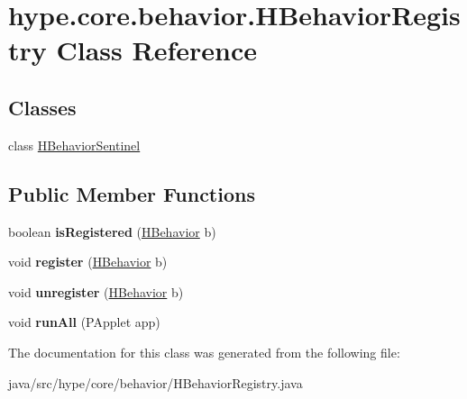 \hypertarget{classhype_1_1core_1_1behavior_1_1_h_behavior_registry}{\section{hype.\-core.\-behavior.\-H\-Behavior\-Registry Class Reference}
\label{classhype_1_1core_1_1behavior_1_1_h_behavior_registry}
}
\subsection*{Classes}
\begin{DoxyCompactItemize}
\item 
class \hyperlink{classhype_1_1core_1_1behavior_1_1_h_behavior_registry_1_1_h_behavior_sentinel}{H\-Behavior\-Sentinel}
\end{DoxyCompactItemize}
\subsection*{Public Member Functions}
\begin{DoxyCompactItemize}
\item 
\hypertarget{classhype_1_1core_1_1behavior_1_1_h_behavior_registry_a0cc3b424160638e969abbcdd5b82584a}{boolean {\bfseries is\-Registered} (\hyperlink{classhype_1_1core_1_1behavior_1_1_h_behavior}{H\-Behavior} b)}\label{classhype_1_1core_1_1behavior_1_1_h_behavior_registry_a0cc3b424160638e969abbcdd5b82584a}

\item 
\hypertarget{classhype_1_1core_1_1behavior_1_1_h_behavior_registry_a2701612175cd8b3a462901daa47fc447}{void {\bfseries register} (\hyperlink{classhype_1_1core_1_1behavior_1_1_h_behavior}{H\-Behavior} b)}\label{classhype_1_1core_1_1behavior_1_1_h_behavior_registry_a2701612175cd8b3a462901daa47fc447}

\item 
\hypertarget{classhype_1_1core_1_1behavior_1_1_h_behavior_registry_a8d629e2fe4cfaa227af56a070a68c598}{void {\bfseries unregister} (\hyperlink{classhype_1_1core_1_1behavior_1_1_h_behavior}{H\-Behavior} b)}\label{classhype_1_1core_1_1behavior_1_1_h_behavior_registry_a8d629e2fe4cfaa227af56a070a68c598}

\item 
\hypertarget{classhype_1_1core_1_1behavior_1_1_h_behavior_registry_a6507b839df6587595558be0d8a86651f}{void {\bfseries run\-All} (P\-Applet app)}\label{classhype_1_1core_1_1behavior_1_1_h_behavior_registry_a6507b839df6587595558be0d8a86651f}

\end{DoxyCompactItemize}


The documentation for this class was generated from the following file\-:\begin{DoxyCompactItemize}
\item 
java/src/hype/core/behavior/H\-Behavior\-Registry.\-java\end{DoxyCompactItemize}
